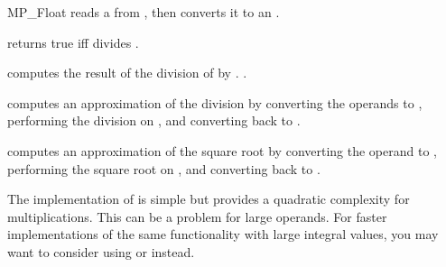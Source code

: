 \begin{ccRefClass} {MP_Float}
{reads a  from , then converts it to an .}

{returns true iff  divides .}

{computes the result of the division of  by .
.}

{computes an approximation of the division by converting the operands to
, performing the division on , and converting back to
.}

{computes an approximation of the square root by converting the operand to
, performing the square root on , and converting back
to .}


\ccImplementation 
The implementation of  is simple but provides a quadratic
complexity for multiplications.  This can be a problem for large operands.
For faster implementations of the same functionality with large integral
values, you may want to consider using  or  instead.

\end{ccRefClass} 
